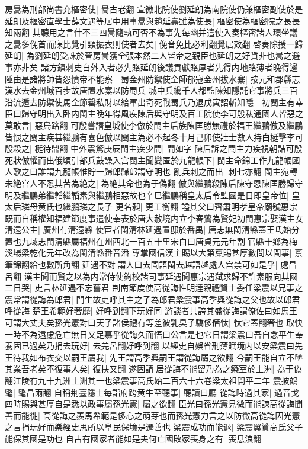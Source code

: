 房暠為刑部尚書充樞密使|{
	暠古老翻}
宣徽北院使劉延朗為南院使仍兼樞密副使於是延朗及樞密直學士薛文遇等居中用事暠與趙延壽雖為使長|{
	樞密使為樞密院之長長知兩翻}
其聽用之言什不三四暠隨執可否不為事先每幽并遣使入奏樞密諸人環坐議之暠多俛首而寐比覺引頸振衣則使者去矣|{
	俛音免比必利翻覺居效翻}
啓奏除授一歸延朗|{
	為劉延朗受誅於晉房暠獲全張本然二人皆帝之親臣也延朗之好貨非也暠之避事亦非矣}
諸方鎮刺史自外入者必先賂延朗後議貢獻賂厚者先得内地賂薄者晩得邊陲由是諸將帥皆怨憤帝不能察　蜀金州防禦使全師郁寇金州拔水寨|{
	按元和郡縣志漢水去金州城百步故唐置水寨以防蜀兵}
城中兵纔千人都監陳知隱託它事將兵三百沿流遁去防禦使馬全節罄私財以給軍出奇死戰蜀兵乃退戊寅詔斬知隱　初閩主有幸臣曰歸守明出入卧内閩主晩年得風疾陳后與守明及百工院使李可殷私通國人皆惡之莫敢言|{
	惡烏路翻}
可殷嘗譛皇城使李倣於閩主后族陳匡勝無禮於福王繼鵬倣及繼鵬皆恨之閩主疾甚繼鵬有喜色倣以閩主為必不起冬十月己卯使壯士數人持白梃擊李可殷殺之|{
	梃待鼎翻}
中外震驚庚辰閩主疾少間|{
	間如字}
陳后訴之閩主力疾視朝詰可殷死狀倣懼而出俄頃引部兵鼓譟入宫閩主聞變匿於九龍帳下|{
	閩主命錦工作九龍帳國人歌之曰誰謂九龍帳惟貯一歸郎歸郎謂守明也}
亂兵刺之而出|{
	刺七亦翻}
閩主宛轉未絶宫人不忍其苦為絶之|{
	為絶其命也為于偽翻}
倣與繼鵬殺陳后陳守恩陳匡勝歸守明及繼鵬弟繼韜繼韜素與繼鵬相惡故也辛巳繼鵬稱皇太后令監國是日即皇帝位|{
	皇太后璘母黄氏也繼鵬璘之長子}
更名昶|{
	更工衡翻}
謚其父曰齊肅明孝皇帝廟號惠宗既而自稱權知福建節度事遣使奉表於唐大赦境内立李春鷰為賢妃初閩惠宗娶漢主女清遠公主|{
	廣州有清遠縣}
使宦者閩清林延遇置邸於番禺|{
	唐志無閩清縣蓋王氐始分置也九域志閩清縣屬福州在州西北一百五十里宋白曰唐貞元元年割官縣十鄉為梅溪場梁乾化元年改為閩清縣番音潘}
專掌國信漢主賜以大第稟賜甚厚數問以閩事|{
	禀筆錦翻給也數所角翻}
延遇不對謂人曰去閩語閩去越語越處人宫禁可如是乎|{
	處昌呂翻}
漢主聞而賢之以為内常侍使鉤校諸司事延遇聞惠宗遇弑求歸不許素服向其國三日哭|{
	史言林延遇不忘舊君}
荆南節度使高從誨性明逹親禮賢士委任梁震以兄事之震常謂從誨為郎君|{
	門生故吏呼其主之子為郎君梁震事高季興從誨之父也故以郎君呼從誨}
楚王希範好奢靡|{
	好呼到翻下玩好同}
游談者共誇其盛從誨謂僚佐曰如馬王可謂大丈夫矣孫光憲對曰天子諸侯禮有等差彼乳臭子驕侈僭忲|{
	忲它蓋翻奢也}
取快一時不為遠慮危亡無日又足慕乎從誨久而悟曰公言是也它日謂梁震曰吾自念平生奉養固已過矣乃捐去玩好|{
	去羌呂翻好呼到翻}
以經史自娛省刑薄賦境内以安梁震曰先王待我如布衣交以嗣王屬我|{
	先王謂高季興嗣王謂從誨屬之欲翻}
今嗣王能自立不墜其業吾老矣不復事人矣|{
	復扶又翻}
遂固請居從誨不能留乃為之築室於土洲|{
	為于偽翻江陵有九十九洲土洲其一也梁震事高氏始二百六十六卷梁太祖開平二年}
震披鶴氅|{
	氅昌兩翻}
自稱荆臺隱士每詣府跨黄牛至聽事|{
	聽讀曰廳}
從誨時過其家|{
	過音戈}
四時賜與甚厚自是悉以政事屬孫光憲|{
	屬之欲翻}
臣光曰孫光憲見微而能諫高從誨聞善而能徙|{
	高從誨之羨馬希範是侈心之萌芽也而孫光憲力言之以防微高從誨因光憲之言捐玩好而樂經史思所以阜民保境是遷善也}
梁震成功而能退|{
	梁震翼贊高氏父子能保其國是功也}
自古有國家者能如是夫何亡國敗家喪身之有|{
	喪息浪翻}


